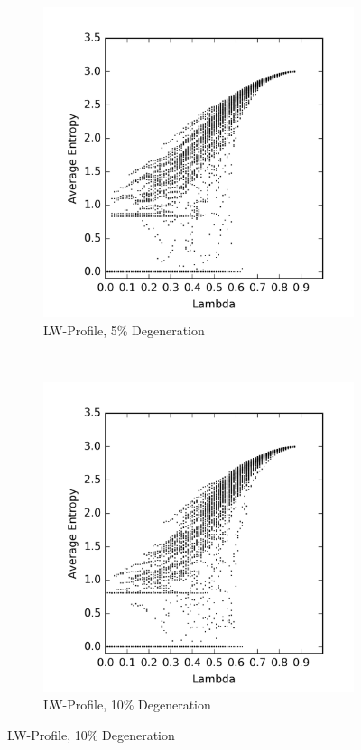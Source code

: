 \documentclass[a4paper,11pt]{report}
\begin{document}
\begin{figure}[htp]
\centering
\begin{subfigure}[t]{0.4\textwidth}
  \includegraphics[width=\textwidth]{ch6_figs/degen_stoma_5}
  \caption{LW-Profile, 5\% Degeneration}
  \label{fig:lw_degen_pt_5}
\end{subfigure}
~
\begin{subfigure}[t]{0.4\textwidth}
  \centering
  \includegraphics[width=\textwidth]{ch6_figs/degen_stoma_10}
  \caption{LW-Profile, 10\% Degeneration}
  \label{fig:lw_degen_pt_10}
  \end{subfigure}


\end{figure}
\end{document}
